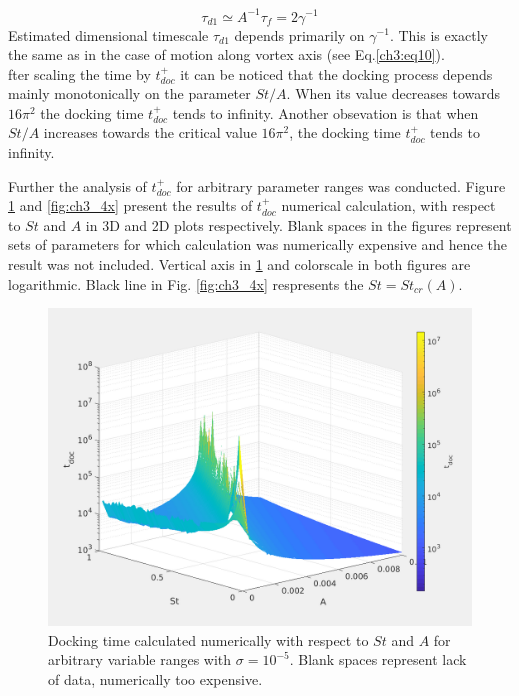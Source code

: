 \documentclass[../main.tex]{subfiles}
\begin{document}
\begin{equation}
\tau_{d1} \simeq A^{-1} \tau_f=2 \gamma^{-1}
\label{ch3:eq26}
\end{equation}
Estimated dimensional timescale $\tau_{d1}$ depends primarily on $\gamma^{-1}$. This is exactly the same as in the case of motion along vortex axis (see Eq.\ref{ch3:eq10}).\\




fter scaling the time by $t^+_{doc}$ it can be noticed that the docking process depends mainly monotonically on the parameter $St/A$. When its value decreases towards $16 \pi^2$ the docking time $t^+_{doc}$ tends to infinity.
Another obsevation is that when $St/A$ increases towards the critical value $16 \pi^2$, the docking time $t^+_{doc}$  tends to infinity.



Further the analysis of $t^+_{doc}$ for arbitrary parameter ranges was conducted. Figure \ref{fig:ch3_4} and \ref{fig:ch3_4x} present the results of $t^+_{doc}$ numerical calculation, with respect to $St$ and $A$ in 3D and 2D plots respectively. Blank spaces in the figures represent sets of parameters for which calculation was numerically expensive and hence the result was not included. Vertical axis in \ref{fig:ch3_4} and colorscale in both figures are logarithmic. Black line in Fig. \ref{fig:ch3_4x} respresents the $St=St_{cr}(A)$.

\begin{figure}
\centering
\noindent \includegraphics[width=30pc]{gfx/St_A_logt_exit_part_3D_eps000001_no_interp.png}
\caption{Docking time calculated numerically with respect to $St$ and $A$ for arbitrary variable ranges with $\sigma=10^{-5}$. Blank spaces represent lack of data, numerically too expensive.}
\label{fig:ch3_4}
\end{figure}
\end{document}
